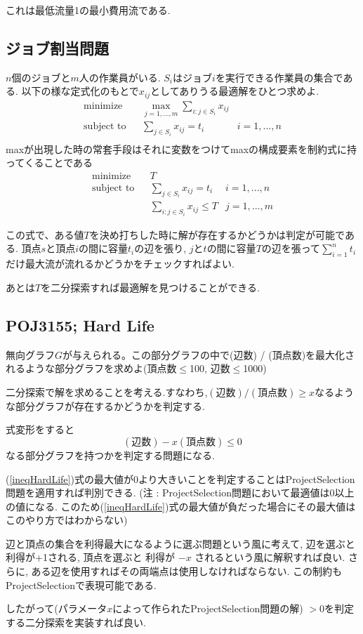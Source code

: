 \documentclass[13pt, a4paper, landscape]{jarticle}
\theoremstyle{nonitalic} %
\begin{document}
これは最低流量1の最小費用流である.

\subsection{ジョブ割当問題}
$n$個のジョブと$m$人の作業員がいる.
$S_i$はジョブ$i$を実行できる作業員の集合である.
以下の様な定式化のもとで$x_{ij}$としてありうる最適解をひとつ求めよ.
\begin{align}
  &&&&& \textrm{minimize}   && \max_{j=1,...,m} \sum_{i:j \in S_i} x_{ij} \\
  &&&&& \textrm{subject to} && \sum_{j \in S_i} x_{ij} = t_i  & i=1,...,n &&&&&\\
\end{align}
maxが出現した時の常套手段はそれに変数をつけてmaxの構成要素を制約式に持ってくることである
\begin{align}
  &&&&& \textrm{minimize}   && T \\
  &&&&& \textrm{subject to} && \sum_{j \in S_i} x_{ij} = t_i  & i=1,...,n &&&&&\\
  &&&&&                     &&  \sum_{i:j \in S_i} x_{ij} \leq T & j=1,...,m
\end{align}

この式で、ある値$T$を決め打ちした時に解が存在するかどうかは判定が可能である. 頂点$s$と頂点$i$の間に容量$t_i$の辺を張り, $j$と$t$の間に容量$T$の辺を張って$\sum_{i=1}^n t_i $ だけ最大流が流れるかどうかをチェックすればよい.

あとは$T$を二分探索すれば最適解を見つけることができる.


\subsection{POJ3155; Hard Life}
無向グラフ$G$が与えられる。この部分グラフの中で(辺数) / (頂点数)を最大化されるような部分グラフを求めよ(頂点数$\leq$100, 辺数$\leq$1000)

二分探索で解を求めることを考える.すなわち,$ (\textrm{辺数}) / (\textrm{頂点数})  \geq x$なるような部分グラフが存在するかどうかを判定する.

式変形をすると
\begin{equation}
  (\textrm{辺数}) - x (\textrm{頂点数}) \leq 0 \label{ineqHardLife}
\end{equation}
なる部分グラフを持つかを判定する問題になる.

(\ref{ineqHardLife})式の最大値が0より大きいことを判定することはProjectSelection問題を適用すれば判別できる. (注 : ProjectSelection問題において最適値は0以上の値になる. このため(\ref{ineqHardLife})式の最大値が負だった場合にその最大値はこのやり方ではわからない)

辺と頂点の集合を利得最大になるように選ぶ問題という風に考えて, 辺を選ぶと 利得が+1される, 頂点を選ぶと 利得が $-x$ されるという風に解釈すれば良い. さらに, ある辺を使用すればその両端点は使用しなければならない. この制約もProjectSelectionで表現可能である. 

したがって(パラメータ$x$によって作られたProjectSelection問題の解) $>0$を判定する二分探索を実装すれば良い. 


\end{document}
